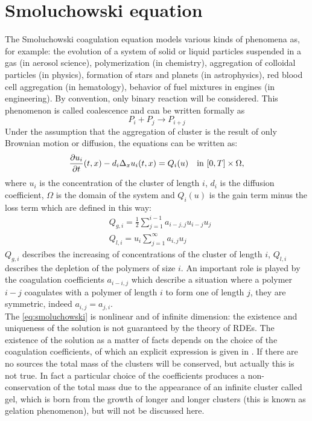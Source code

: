 \section{Smoluchowski equation}
The Smoluchowski coagulation equation models various kinds of phenomena as, for example: the evolution of a system of solid or liquid particles suspended in a gas (in
aerosol science), polymerization (in chemistry), aggregation of colloidal particles (in physics), formation of stars and planets (in astrophysics), red blood cell aggregation (in
hematology), behavior of fuel mixtures in engines (in engineering). By convention, only binary reaction will be considered.
This phenomenon is called coalescence and can be written formally as 
\[
    P_i + P_j \rightarrow P_{i+j}
\]
Under the assumption that the aggregation of cluster is the result of only Brownian motion or diffusion, the equations can be written as:
\begin{equation}
    \frac{\partial u_i}{\partial t}(t,x) - d_i \Delta_x u_i(t,x) = Q_i(u) \quad \text{in } [0,T] \times \Omega,
    \label{eq:smoluchowski}
\end{equation}
where \(u_i\) is the concentration of the cluster of length \(i\), \(d_i\) is the diffusion coefficient, \(\Omega\) is the domain of the system and \(Q_i(u)\) is the gain term minus the loss term which  are defined in this way:
\begin{equation*}
    \begin{aligned}
    &Q_{g, i}=\frac{1}{2} \sum_{j=1}^{i-1} a_{i-j, j} u_{i-j} u_{j} \\
    &Q_{l, i}=u_{i} \sum_{j=1}^{\infty} a_{i, j} u_{j}
    \end{aligned}
\end{equation*}
$Q_{g,i}$ describes the increasing of concentrations of the cluster of length $i$,
$Q_{l,i}$ describes the depletion of the polymers of size $i$.
An important role is played by the coagulation coefficients $a_{i-i,j}$ which describe a situation where a polymer $i-j$ coagulates with a polymer of length $i$ to form one of length $j$, they are symmetric, indeed $a_{i,j}=a_{j,i}$.\\
The \eqref{eq:smoluchowski} is nonlinear and of infinite dimension: the existence and uniqueness of the solution is not guaranteed by the theory of RDEs. The existence of the solution as a matter of facts depends on the choice of the coagulation coefficients, of which an explicit expression is given in \cite{Bertsch}.
If there are no sources the total mass of the clusters will be conserved, but actually this is not true. In fact a particular choice of the coefficients produces a non-conservation of the total mass due to the appearance of an infinite cluster called gel, which is born from the growth of longer and longer clusters (this is known as gelation phenomenon), but will not be discussed here.
